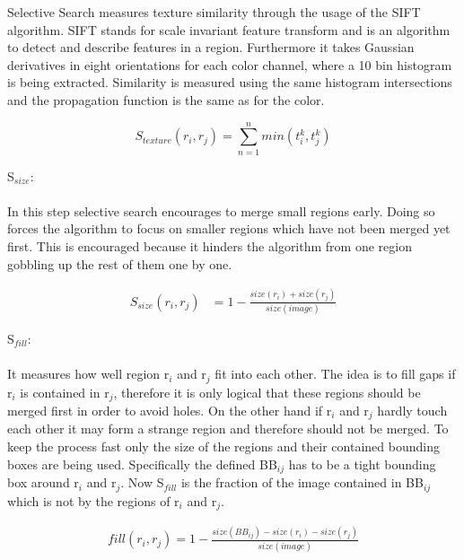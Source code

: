 Selective Search measures texture similarity through the usage of the SIFT algorithm. SIFT stands for scale invariant
feature transform and is an algorithm to detect and describe features in a region. Furthermore it takes Gaussian derivatives
in eight orientations for each color channel, where a 10 bin histogram is being extracted. Similarity is measured
using the same histogram intersections and the propagation function is the same as for the color.\cite{selectivesearch}
\begin{center}
    \begin{equation*}
        S_{texture}(r_i,r_j) = \sum_{n=1}^{n} min(t_i^{k},t_j^{k})
    \end{equation*}\cite{selectivesearch}
\end{center}
S$_{size}$: \\ \\
In this step selective search encourages to merge small regions early. Doing so forces the algorithm to focus
on smaller regions which have not been merged yet first. This is encouraged because it hinders the algorithm from one
region gobbling up the rest of them one by one.\cite{selectivesearch}
\begin{center}
    \begin{equation*}
        \begin{split}
            S_{size}(r_i,r_j) & = 1 - \frac{size(r_i)+size(r_j)}{size(image)}
        \end{split}
    \end{equation*}\cite{selectivesearch}
\end{center}
S$_{fill}$: \\ \\
It measures how well region r$_i$ and r$_j$ fit into each other. The idea is to fill gaps if r{$_i$} is contained in
r$_j$, therefore it is only logical that these regions should be merged first in order to avoid holes. On the other hand
if r$_i$ and r$_j$ hardly touch each other it may form a strange region and therefore should not be merged. To keep
the process fast only the size of the regions and their contained bounding boxes are being used. Specifically the defined
BB$_{ij}$ has to be a tight bounding box around r$_i$ and r$_j$. Now S$_{fill}$ is the fraction of the image
contained in BB$_{ij}$ which is not by the regions of r$_i$ and r$_j$.\cite{selectivesearch}
\vspace{0.25cm}
\begin{center}
    \begin{equation*}
        \begin{split}
            fill(r_i, r_j) = 1 - \frac{size(BB_{ij}) - size(r_i) - size(r_j)}{size(image)}
        \end{split}
    \end{equation*}\cite{selectivesearch}
\end{center}
